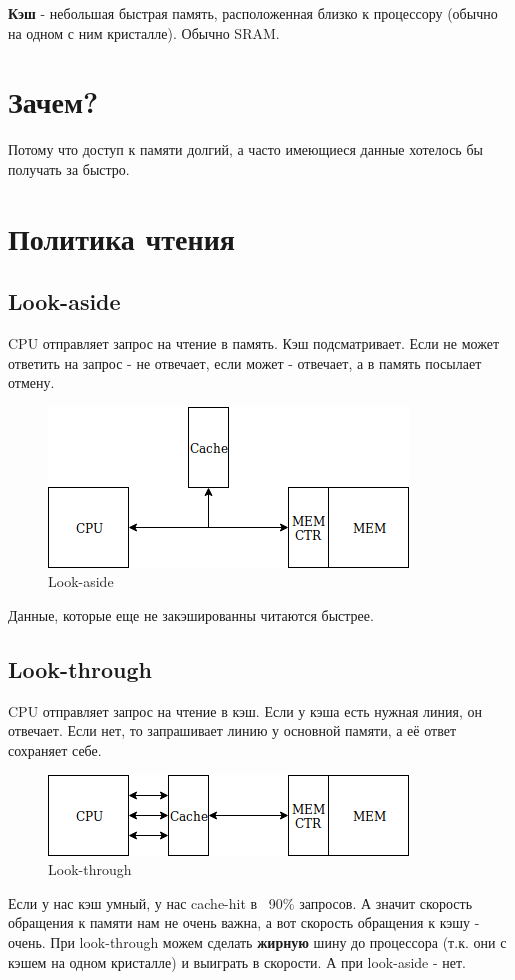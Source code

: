 \documentclass[12pt, a4paper]{article}
\begin{document}
\textbf{Кэш} - небольшая быстрая память, расположенная близко к процессору (обычно на одном с ним кристалле). Обычно SRAM.
\section{Зачем?}
Потому что доступ к памяти долгий, а часто имеющиеся данные хотелось бы получать за быстро.
\section{Политика чтения}
\subsection{Look-aside}
CPU отправляет запрос на чтение в память. Кэш подсматривает. Если не может ответить на запрос - не отвечает, если может - отвечает, а в память посылает отмену.\\
\begin{figure}[h]
    \centering
    \includegraphics[scale=0.5]{images/LookAside.png}
    \caption{Look-aside}
    \label{fig:LookAside}
\end{figure}
Данные, которые еще не закэшированны читаются быстрее. 
\subsection{Look-through}
CPU отправляет запрос на чтение в кэш. Если у кэша есть нужная линия, он отвечает. Если нет, то запрашивает линию у основной памяти, а её ответ сохраняет себе.
\begin{figure}[h]
    \centering
    \includegraphics[scale=0.5]{images/LookThrough.png}
    \caption{Look-through}
    \label{fig:LookThrough}
\end{figure}
Если у нас кэш умный, у нас cache-hit в ~90\% запросов. А значит скорость обращения к памяти нам не очень важна, а вот скорость обращения к кэшу - очень. При look-through можем сделать \textbf{жирную} шину до процессора (т.к. они с кэшем на одном кристалле) и выиграть в скорости. А при look-aside - нет.
\end{document}
